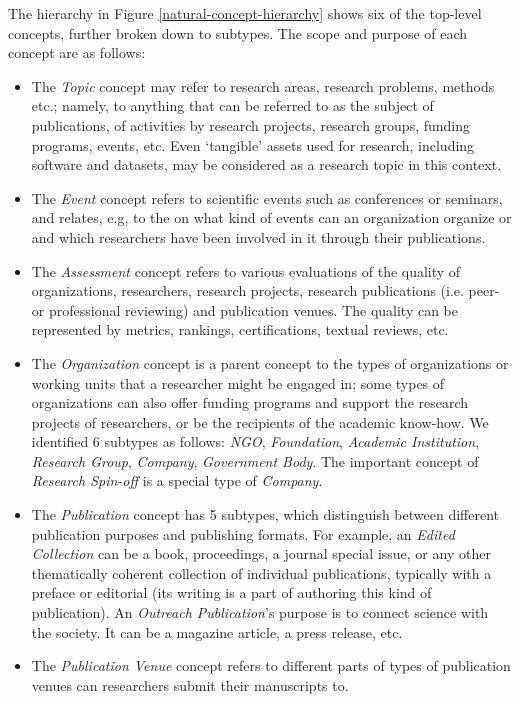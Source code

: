 The hierarchy in Figure \ref{natural-concept-hierarchy} shows six of the top-level concepts, further broken down to subtypes. The scope and purpose of each concept are as follows:
\begin{itemize}
    \item The \textit{Topic} concept may refer to research areas, research problems, methods etc.; namely, to anything that can be referred to as the subject of publications, of activities by research projects, research groups, funding programs, events, etc. Even `tangible' assets used for research, including software and datasets, may be considered as a research topic in this context.

    \item The \textit{Event} concept refers to scientific events such as conferences or seminars, and relates, e.g, to the on what kind of events can an organization organize or and which researchers have been involved in it through their publications.

    \item The \textit{Assessment} concept refers to various evaluations of the quality of organizations, researchers, research projects, research publications (i.e. peer- or professional reviewing) and publication venues. The quality can be represented by metrics, rankings, certifications, textual reviews, etc.

    \item The \textit{Organization} concept is a parent concept to the types of organizations or working units that a researcher might be engaged in; some types of organizations can also offer funding programs and support the research projects of researchers, or be the recipients of the academic know-how. We  identified 6 subtypes as follows: \textit{NGO}, \textit{Foundation}, \textit{Academic Institution}, \textit{Research Group}, \textit{Company}, \textit{Government Body}. The important concept of \textit{Research Spin-off} is a special type of \textit{Company}. 

    \item The \textit{Publication} concept has 5 subtypes, which distinguish between different publication purposes and publishing formats. For example, an \textit{Edited Collection} can be a book, proceedings, a journal special issue, or any other thematically coherent collection of individual publications, typically with a preface or editorial (its writing is a part of authoring this kind of publication). An \textit{Outreach Publication}'s purpose is to connect science with the society. It can be a magazine article, a press release, etc.

    \item The \textit{Publication Venue} concept refers to different parts of types of publication venues can researchers submit their manuscripts to.
\end{itemize}

